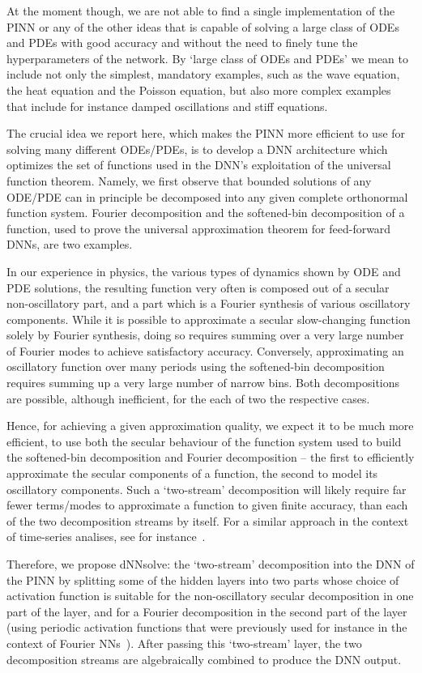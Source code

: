 \documentclass{article}
\begin{document}
At the moment though, we are not able to find a single implementation of the PINN or any of the other ideas that is capable of solving a large class of ODEs and PDEs with good accuracy and without the need to finely tune the hyperparameters of the network. By `large class of ODEs and PDEs’ we mean to include not only the simplest, mandatory examples, such as the wave equation, the heat equation and the Poisson equation, but also more complex examples that include for instance damped oscillations and stiff equations. 

The crucial idea we report here, which makes the PINN more efficient to use for solving many different ODEs/PDEs, is to develop a DNN architecture which optimizes the set of functions used in the DNN's exploitation of the universal function theorem. Namely, we first observe that bounded solutions of any ODE/PDE can in principle be decomposed into any given complete orthonormal function system. Fourier decomposition and the softened-bin decomposition of a function, used to prove the universal approximation theorem for feed-forward DNNs, are two examples. 

In our experience in physics, the various types of dynamics shown by ODE and PDE solutions, the resulting function very often is composed out of a secular non-oscillatory part, and a part which is a Fourier synthesis of various oscillatory components. While it is possible to approximate a secular slow-changing function solely by Fourier synthesis, doing so requires summing over a very large number of Fourier modes to achieve satisfactory accuracy. Conversely, approximating an oscillatory function over many periods using the softened-bin decomposition requires summing up a very large number of narrow bins. Both decompositions are possible, although inefficient, for the each of two the respective cases. 

Hence, for achieving a given approximation quality, we expect it to be much more efficient, to use both the secular behaviour of the function system used to build the softened-bin decomposition and Fourier decomposition -- the first to efficiently approximate the secular components of a function, the second to model its oscillatory components. Such a `two-stream' decomposition will likely require far fewer terms/modes to approximate a function to given finite accuracy, than each of the two decomposition streams by itself. For a similar approach in the context of time-series analises, see for instance~\cite{TimeSeries}.

Therefore, we propose \textsf{dNNsolve}: the `two-stream' decomposition into the DNN of the PINN by splitting some of the hidden layers into two parts whose choice of activation function is suitable for the non-oscillatory secular decomposition in one part of the layer, and for a Fourier decomposition in the second part of the layer (using periodic activation functions that were previously used for instance in the context of Fourier NNs~\cite{Silvescu1999FourierNN, sitzmann2020implicit}). After passing this `two-stream' layer, the two decomposition streams are algebraically combined to produce the DNN output.
\end{document}
